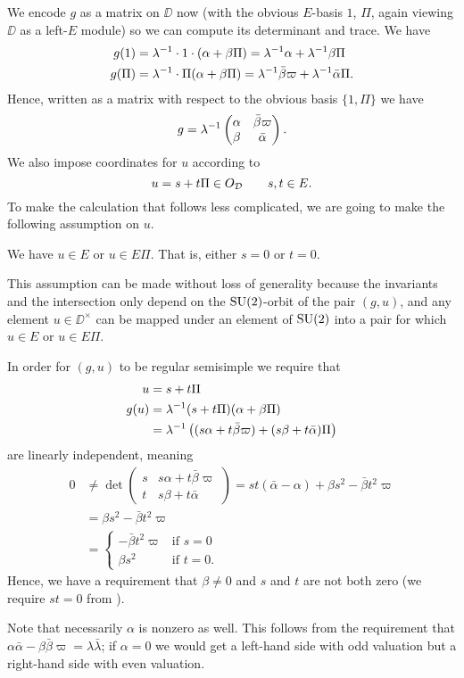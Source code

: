 We encode $g$ as a matrix on $\DD$ now (with the obvious $E$-basis $1$, $\Pi$,
again viewing $\DD$ as a left-$E$ module)
so we can compute its determinant and trace.
We have
\begin{align*}
  g(1) &= \lambda^{-1} \cdot 1 \cdot (\alpha + \beta \Pi)
    = \lambda^{-1} \alpha + \lambda^{-1} \beta \Pi \\
  g(\Pi) &= \lambda^{-1} \cdot \Pi (\alpha + \beta \Pi)
    = \lambda^{-1} \bar\beta \varpi + \lambda^{-1} \bar\alpha \Pi.
\end{align*}
Hence, written as a matrix with respect to the obvious basis $\{1, \Pi\}$ we have
\[ g = \lambda^{-1} \begin{pmatrix}
  \alpha & \bar\beta \varpi \\
  \beta &  \bar\alpha
  \end{pmatrix}. \]
We also impose coordinates for $u$ according to
\[ u = s + t \Pi \in O_\mathcal D \qquad s, t \in E. \]
To make the calculation that follows less complicated,
we are going to make the following assumption on $u$.
\begin{assume}
  We have $u \in E$ or $u \in E \Pi$.
  That is, either $s = 0$ or $t = 0$.
  \label{assume:st_zero}
\end{assume}
This assumption can be made without loss of generality because
the invariants and the intersection only depend
on the $\operatorname{SU}(2)$-orbit of the pair $(g,u)$,
and any element $u \in \DD^\times$ can be mapped under an element of $\operatorname{SU}(2)$
into a pair for which $u \in E$ or $u \in E \Pi$.

In order for $(g,u)$ to be regular semisimple we require that
\begin{align*}
  u &= s + t \Pi \\
  g(u) &= \lambda^{-1} (s + t \Pi)(\alpha + \beta \Pi) \\
  &= \lambda^{-1} \left( (s \alpha + t \bar\beta \varpi) + (s \beta + t \bar\alpha)\Pi \right)
\end{align*}
are linearly independent, meaning
\begin{align*}
  0 &\neq
  \det \begin{pmatrix}
    s & s \alpha + t \bar \beta \varpi \\
    t & s \beta + t \bar \alpha
  \end{pmatrix}
  = st(\bar\alpha - \alpha) + \beta s^2 - \bar\beta t^2 \varpi \\
  &= \beta s^2 - \bar\beta t^2 \varpi \\
  &= \begin{cases}
    -\bar\beta t^2 \varpi & \text{if } s = 0 \\
    \beta s^2 & \text{if } t = 0.
  \end{cases}
\end{align*}
Hence, we have a requirement that $\beta \neq 0$
and $s$ and $t$ are not both zero (we require $st = 0$ from ).
\begin{remark}
  Note that necessarily $\alpha$ is nonzero as well.
  This follows from the requirement that
  $\alpha \bar \alpha - \beta \bar \beta \varpi = \lambda \bar\lambda$;
  if $\alpha = 0$ we would get a left-hand side with odd valuation
  but a right-hand side with even valuation.
\end{remark}

